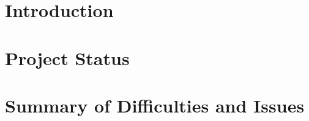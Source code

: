 \documentclass[a4paper,12pt]{article}
\begin{document}
	
	\tableofcontents
	\clearpage
	
	
	
	\section{Introduction}
	\label{sec:introduction}
	
	
	\section{Project Status}
	\label{sec:project_status}
	
	
	\section{Summary of Difficulties and Issues}
	\label{sec:difficulties}
	
	
	\printbibliography
	
	\newpage
	\appendix
    \appendixpage
    
	
    
\end{document}
